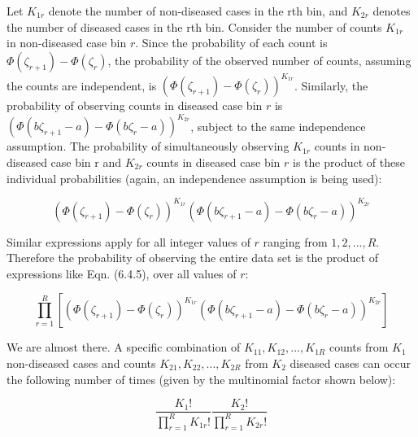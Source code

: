 \documentclass[
]{book}
\begin{document}
Let \(K_{1r}\) denote the number of non-diseased cases in the rth bin, and \(K_{2r}\) denotes the number of diseased cases in the rth bin. Consider the number of counts \(K_{1r}\) in non-diseased case bin \(r\). Since the probability of each count is \(\Phi\left ( \zeta_{r+1} \right ) - \Phi\left ( \zeta_r \right )\), the probability of the observed number of counts, assuming the counts are independent, is \({\left(\Phi\left ( \zeta_{r+1} \right ) - \Phi\left ( \zeta_r \right ) \right )}^{K_{1r}}\). Similarly, the probability of observing counts in diseased case bin \(r\) is \({\left (\Phi\left ( b\zeta_{r+1}-a \right ) - \Phi\left ( b\zeta_r-a \right ) \right )}^{K_{2r}}\), subject to the same independence assumption. The probability of simultaneously observing \(K_{1r}\) counts in non-diseased case bin r and \(K_{2r}\) counts in diseased case bin \(r\) is the product of these individual probabilities (again, an independence assumption is being used):

\begin{equation*} 
\left (\Phi\left ( \zeta_{r+1}  \right ) - \Phi\left ( \zeta_r  \right )  \right )^{K_{1r}} \left (\Phi\left ( b\zeta_{r+1}-a  \right ) - \Phi\left ( b\zeta_r-a  \right )  \right )^{K_{2r}}
\end{equation*}

Similar expressions apply for all integer values of \(r\) ranging from \(1,2,...,R\). Therefore the probability of observing the entire data set is the product of expressions like Eqn. (6.4.5), over all values of \(r\):

\begin{equation} 
\prod_{r=1}^{R}\left [\left (\Phi\left ( \zeta_{r+1}  \right ) - \Phi\left ( \zeta_r  \right )  \right )^{K_{1r}} \left (\Phi\left ( b\zeta_{r+1}-a  \right ) - \Phi\left ( b\zeta_r-a  \right )  \right )^{K_{2r}}  \right ]
\label{eq:binormal-modelProductProb}
\end{equation}

We are almost there. A specific combination of \(K_{11},K_{12},...,K_{1R}\) counts from \(K_1\) non-diseased cases and counts \(K_{21},K_{22},...,K_{2R}\) from \(K_2\) diseased cases can occur the following number of times (given by the multinomial factor shown below):

\begin{equation} 
\frac{K_1!}{\prod_{r=1}^{R}K_{1r}!}\frac{K_2!}{\prod_{r=1}^{R}K_{2r}!}
\label{eq:binormal-modelCombFactor}
\end{equation}
\end{document}
